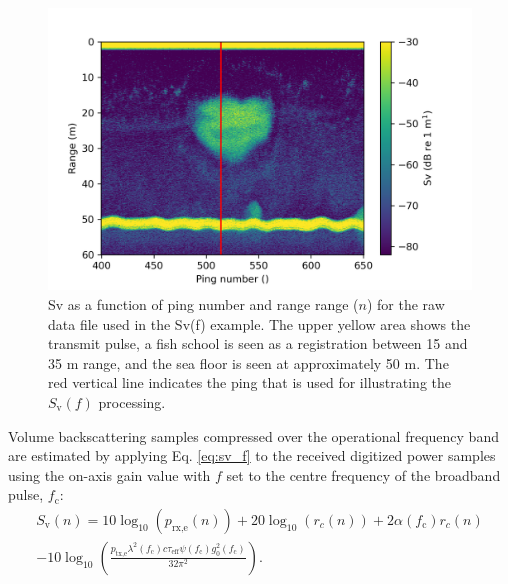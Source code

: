 \documentclass[preprint,12pt,TurnOnLineNumbers]{JASAnew}
\newcommand{\freqsym}{f}
\newcommand{\samplesymt}{n}
\newcommand{\fc}{f_{\textrm{c}}}
\newcommand{\ptxe}{p_{\textrm{tx,e}}}
\newcommand{\prxe}{p_{\textrm{rx,e}}}
\newcommand{\teff}{\tau_{\textrm{eff}}}
\newcommand{\tslide}{t_w}
\newcommand{\sv}{S_{\textrm{v}}}
\newcommand{\range}{r}
\newcommand{\gainzero}{g_0}
\newcommand{\eqang}{\psi}
\newcommand{\wlen}{\lambda}
\newcommand{\cw}{c}
\newcommand{\absorp}{\alpha}
\begin{document}
\begin{figure}
\includegraphics[width=16cm]{Fig_Sv_echogram}
\caption{\label{Fig_Sv_echogram} Sv as a function of ping number and range range ($\samplesymt$) for the raw data file used in the Sv(f) example. The upper yellow area shows the transmit pulse, a fish school is seen as a registration between 15 and 35 m range, and the sea floor is seen at approximately 50 m. The red vertical line indicates the ping that is used for illustrating the $\sv(\freqsym)$ processing.}
\end{figure}

Volume backscattering samples compressed over the operational frequency band are estimated by applying Eq. \ref{eq:sv_f} to the received digitized power samples using the on-axis gain value with $f$ set to the centre frequency of the broadband pulse, $\fc$:
\begin{equation}
\label{eq:Sv}
\begin{split}
\sv(\samplesymt)  =  10\log_{10}(\prxe(\samplesymt)) + 20\log_{10}(\range_c(\samplesymt)) + 2\absorp(\fc)\range_c(\samplesymt) \\
- 10\log_{10}\left( \frac{\ptxe \wlen^2(\fc) \cw \teff \eqang(\fc) \gainzero^2(\fc)}{32\pi^2} \right).
\end{split}
\end{equation}
\end{document}

